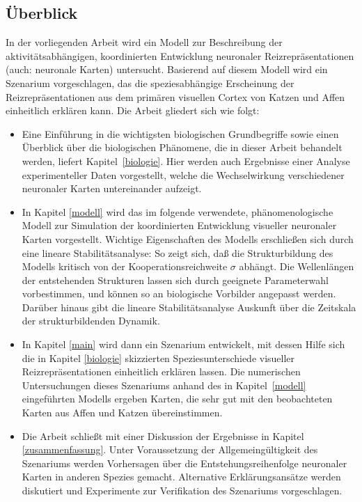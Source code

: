 \subsection{Überblick}

In der vorliegenden Arbeit wird ein Modell zur Beschreibung der
aktivitätsabhängigen, koordinierten Entwicklung neuronaler
Reizrepräsentationen (auch: neuronale Karten) untersucht.  Basierend auf
diesem Modell wird ein Szenarium vorgeschlagen, das die speziesabhängige
Erscheinung der Reizrepräsentationen aus dem primären visuellen Cortex
von Katzen und Affen einheitlich erklären kann.  Die Arbeit gliedert sich
wie folgt:

\begin{itemize}
\item Eine Einführung in die wichtigsten biologischen Grundbegriffe sowie
einen Über\-blick über die biologischen Phänomene, die in dieser Arbeit
behandelt werden, liefert Kapitel~\ref{biologie}. Hier werden auch
Ergebnisse einer Analyse experimenteller Daten vorgestellt, welche die
Wechselwirkung verschiedener neuronaler Karten untereinander aufzeigt.

\item In Kapitel \ref{modell} wird das im folgende verwendete,
phänomenologische Modell zur Simulation der koordinierten Entwicklung
visueller neuronaler Karten vorgestellt. Wichtige Eigenschaften des Modells
erschließen sich durch eine lineare Stabilitätsanalyse: So zeigt sich,
daß die Strukturbildung des Modells kritisch von der
Kooperationsreichweite $\sigma$ abhängt.  Die Wellenlängen der
entstehenden Strukturen lassen sich durch geeignete Parameterwahl
vorbestimmen, und können so an biologische Vorbilder angepasst werden.
Darüber hinaus gibt die lineare Stabilitätsanalyse Auskunft über die
Zeitskala der strukturbildenden Dynamik.

\item In Kapitel \ref{main} wird dann ein Szenarium entwickelt, mit dessen
Hilfe sich die in Kapitel \ref{biologie} skizzierten Speziesunterschiede
visueller Reizrepräsentationen einheitlich erklären lassen.  Die
numerischen Untersuchungen dieses Szenariums anhand des in
Kapitel~\ref{modell} eingeführten Modells ergeben Karten, die sehr gut mit
den beobachteten Karten aus Affen und Katzen übereinstimmen.

\item Die Arbeit schließt mit einer Diskussion der Ergebnisse in Kapitel
\ref{zusammenfassung}. Unter Voraussetzung der Allgemeingültigkeit des
Szenariums werden Vorhersagen über die Entstehungsreihenfolge neuronaler
Karten in anderen Spezies gemacht. Alternative Erklärungsansätze werden
diskutiert und Experimente zur Verifikation des Szenariums vorgeschlagen.
\end{itemize}
